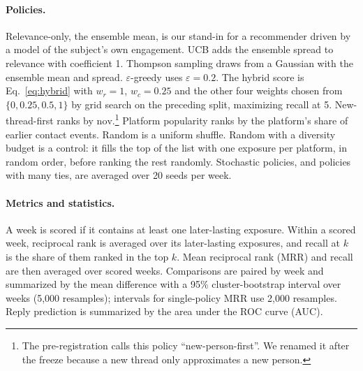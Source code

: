 \documentclass[11pt]{article}
\begin{document}
\paragraph{Policies.} Relevance-only, the ensemble mean, is our stand-in for a recommender driven by a model of the subject's own engagement. UCB adds the ensemble spread to relevance with coefficient 1. Thompson sampling draws from a Gaussian with the ensemble mean and spread. $\varepsilon$-greedy uses $\varepsilon = 0.2$. The hybrid score is Eq.~\ref{eq:hybrid} with $w_r = 1$, $w_c = 0.25$ and the other four weights chosen from $\{0, 0.25, 0.5, 1\}$ by grid search on the preceding split, maximizing recall at 5. New-thread-first ranks by $\mathrm{nov}$.\footnote{The pre-registration calls this policy ``new-person-first''. We renamed it after the freeze because a new thread only approximates a new person.} Platform popularity ranks by the platform's share of earlier contact events. Random is a uniform shuffle. Random with a diversity budget is a control: it fills the top of the list with one exposure per platform, in random order, before ranking the rest randomly. Stochastic policies, and policies with many ties, are averaged over 20 seeds per week.

\paragraph{Metrics and statistics.} A week is scored if it contains at least one later-lasting exposure. Within a scored week, reciprocal rank is averaged over its later-lasting exposures, and recall at $k$ is the share of them ranked in the top $k$. Mean reciprocal rank (MRR) and recall are then averaged over scored weeks. Comparisons are paired by week and summarized by the mean difference with a 95\% cluster-bootstrap interval over weeks (5{,}000 resamples); intervals for single-policy MRR use 2{,}000 resamples. Reply prediction is summarized by the area under the ROC curve (AUC).
\end{document}
